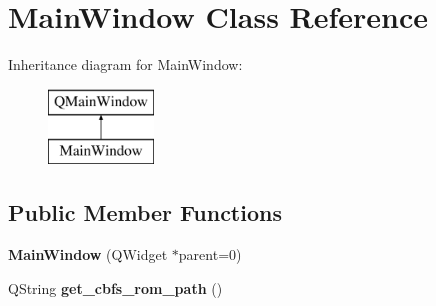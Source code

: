 \hypertarget{classMainWindow}{\section{Main\-Window Class Reference}
\label{classMainWindow}
}
Inheritance diagram for Main\-Window\-:\begin{figure}[H]
\begin{center}
\leavevmode
\includegraphics[height=2.000000cm]{classMainWindow}
\end{center}
\end{figure}
\subsection*{Public Member Functions}
\begin{DoxyCompactItemize}
\item 
\hypertarget{classMainWindow_a8b244be8b7b7db1b08de2a2acb9409db}{{\bfseries Main\-Window} (Q\-Widget $\ast$parent=0)}\label{classMainWindow_a8b244be8b7b7db1b08de2a2acb9409db}

\item 
\hypertarget{classMainWindow_a7aa165ddf55717d85ab6f744f63c8795}{Q\-String {\bfseries get\-\_\-cbfs\-\_\-rom\-\_\-path} ()}\label{classMainWindow_a7aa165ddf55717d85ab6f744f63c8795}

\end{DoxyCompactItemize}
